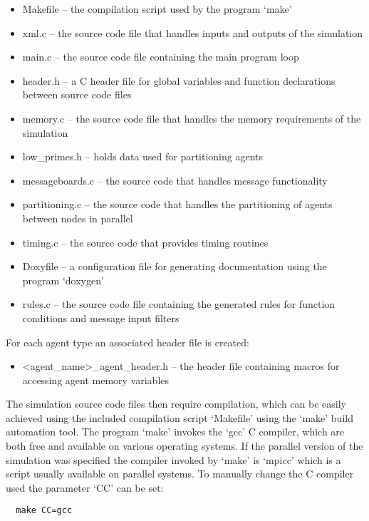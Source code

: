 \begin{itemize}
  \item Makefile -- the compilation script used by the program `make'
  \item xml.c -- the source code file that handles inputs and outputs of the
  simulation
  \item main.c -- the source code file containing the main program loop
  \item header.h -- a C header file for global variables and function
  declarations between source code files
  \item memory.c -- the source code file that handles the memory requirements
  of the simulation
  \item low\_primes.h -- holds data used for partitioning agents
  \item messageboards.c -- the source code that handles message functionality
  \item partitioning.c -- the source code that handles the partitioning of
  agents between nodes in parallel
  \item timing.c -- the source code that provides timing routines
  \item Doxyfile -- a configuration file for generating documentation using
 the program `doxygen'
  \item rules.c -- the source code file containing the generated rules for
  function conditions and message input filters
\end{itemize}

For each agent type an associated header file is created:

\begin{itemize}
\item <agent\_name>\_agent\_header.h -- the header file containing macros for
  accessing agent memory variables
\end{itemize}

The simulation source code files then require compilation, which can be easily
achieved using the included compilation script `Makefile' using the `make'
build automation tool. The program `make' invokes the `gcc' C compiler, which
are both free and available on various operating systems. If the parallel
version of the simulation was specified the compiler invoked by `make' is
`mpicc' which is a script usually available on parallel systems. To manually
change the C compiler used the parameter `CC' can be set:

\begin{verbatim}
  make CC=gcc
\end{verbatim}

